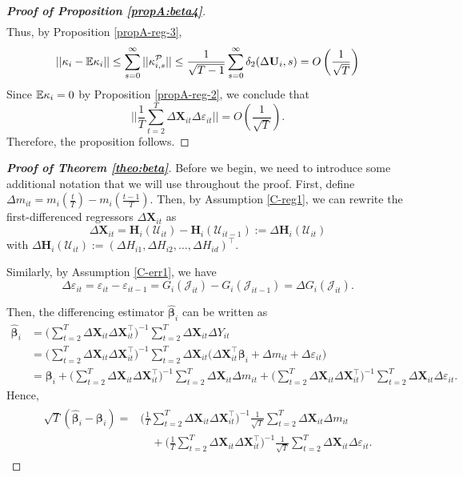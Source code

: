 \documentclass[a4paper,12pt]{article}
\begin{document}
\begin{proof}[\textnormal{\textbf{Proof of Proposition \ref{propA:beta4}}}]
\begin{align*}
\end{align*}
Thus, by Proposition \ref{propA-reg-3},
\[ || \kappa_i - \mathbb{E} \kappa_i || \leq \sum_{s=0}^\infty ||\kappa_{i, s}^{\mathcal{P}} || \leq \frac{1}{\sqrt{T-1}}\sum_{s=0}^\infty \delta_2(\Delta \mathbf{U}_i, s) = O\left(\frac{1}{\sqrt{T}}\right)
\]
Since $\mathbb{E} \kappa_i = 0$ by Proposition \ref{propA-reg-2}, we conclude that
\[  \Big|\Big| \frac{1}{T}\sum_{t=2}^T  \Delta \mathbf{X}_{it}\Delta \varepsilon_{it} \Big|\Big| = O\left(\frac{1}{\sqrt{T}}\right).
\]
Therefore, the proposition follows.
\end{proof}


\begin{proof}[\textnormal{\textbf{Proof of Theorem \ref{theo:beta}}}]


Before we begin, we need to introduce some additional notation that we will use throughout the proof. First, define $\Delta m_{it} = m_i \left( \frac{t}{T} \right) - m_i \left(\frac{t-1}{T}\right)$. Then, by Assumption \ref{C-reg1}, we can rewrite the first-differenced regressors $\Delta  \mathbf{X}_{it}$ as
\[ \Delta \mathbf{X}_{it} =\mathbf{H}_i(\mathcal{U}_{it}) - \mathbf{H}_i(\mathcal{U}_{it-1}) := \Delta \mathbf{H}_i(\mathcal{U}_{it}) \]
with $\Delta \mathbf{H}_i(\mathcal{U}_{it}) := (\Delta H_{i1}, \Delta H_{i2}, \ldots, \Delta H_{id})^\top$.

Similarly, by Assumption \ref{C-err1}, we have
\[\Delta \varepsilon_{it} = \varepsilon_{it} - \varepsilon_{it-1} = G_i(\mathcal{J}_{it}) - G_i(\mathcal{J}_{it-1}) = \Delta G_i(\mathcal{J}_{it}).
\]

Then, the differencing estimator $\widehat{\bm{\beta}}_i$ can be written as
\begin{align*}
\widehat{\bm{\beta}}_i &= \Big( \sum_{t=2}^T \Delta \mathbf{X}_{it} \Delta \mathbf{X}_{it}^\top \Big)^{-1} \sum_{t=2}^T \Delta \mathbf{X}_{it} \Delta Y_{it} \\
& =  \Big( \sum_{t=2}^T \Delta \mathbf{X}_{it} \Delta \mathbf{X}_{it}^\top \Big)^{-1} \sum_{t=2}^T \Delta \mathbf{X}_{it} \bigg(\Delta \mathbf{X}_{it}^\top \bm{\beta}_i +  \Delta m_{it}+ \Delta \varepsilon_{it} \bigg) \\
&= \bm{\beta}_i +   \Big( \sum_{t=2}^T \Delta \mathbf{X}_{it} \Delta \mathbf{X}_{it}^\top \Big)^{-1} \sum_{t=2}^T \Delta \mathbf{X}_{it} \Delta m_{it} +  \Big( \sum_{t=2}^T \Delta \mathbf{X}_{it} \Delta \mathbf{X}_{it}^\top \Big)^{-1} \sum_{t=2}^T \Delta \mathbf{X}_{it} \Delta \varepsilon_{it}. 
\end{align*}
Hence,
\begin{align}\label{theo:beta:proof1}
\begin{split}
 \sqrt{T}( \widehat{\bm{\beta}}_i - \bm{\beta}_i) = &\Big( \frac{1}{T}\sum_{t=2}^T \Delta \mathbf{X}_{it} \Delta \mathbf{X}_{it}^\top \Big)^{-1} \frac{1}{\sqrt{T}}\sum_{t=2}^T \Delta \mathbf{X}_{it} \Delta m_{it} \\
&\quad+  \Big(\frac{1}{T} \sum_{t=2}^T \Delta \mathbf{X}_{it} \Delta \mathbf{X}_{it}^\top \Big)^{-1}\frac{1}{\sqrt{T}} \sum_{t=2}^T \Delta \mathbf{X}_{it} \Delta \varepsilon_{it}.
\end{split}
\end{align}


\end{proof}
\end{document}
